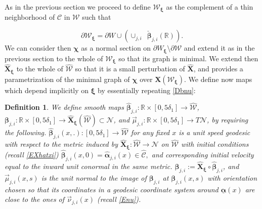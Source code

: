 \documentclass[12pt,namelimits,sumlimits]{amsart}
\newtheorem{definition}[theorem]{Definition}
\theoremstyle{remark}
\numberwithin{equation}{section}
\begin{document}
As in the previous section we proceed to
define ${{\mathcal{W}}}_{{\boldsymbol{\xi}}}$ as the complement of a thin neighborhood of ${{\mathcal{C}}}$ in ${{\mathcal{W}}}$
such that
\addtocounter{theorem}{1}
\begin{equation}
\label{EWxi}
\partial {{\mathcal{W}}}_{{\boldsymbol{\xi}}}=\partial W\cup
\left(\cup_{j,i} \,\,\,{\check{\boldsymbol{\beta}}}_{j,i}({\mathbb{R}})\right).
\end{equation}
We can consider then ${\boldsymbol{\chi}}$ as a normal section on $\partial W_{{\boldsymbol{\xi}}}\setminus\partial{{\mathcal{W}}}$
and extend it as in the previous section to the whole of ${{\mathcal{W}}}_{{\boldsymbol{\xi}}}$
so that its graph is minimal.
We extend then 
${\widehat{\boldsymbol{X}}}_{{\boldsymbol{\xi}}}$ to the whole of ${{\widehat{{\mathcal{W}}}}}$ so that it is a small perturbation of ${\widehat{\boldsymbol{X}}}$,
and provides a parametrization of the minimal graph of ${\boldsymbol{\chi}}$ over ${\boldsymbol{X}}({{\mathcal{W}}}_{{\boldsymbol{\xi}}})$.
We define now maps which depend implicitly on ${{\boldsymbol{\xi}}}$ by essentially repeating \ref{Dbnu}:

\addtocounter{equation}{1}
\begin{definition}
\label{Dbnuxi}
We define smooth maps
${\widehat{\boldsymbol{\beta}}}_{j,i}:{\mathbb{R}}\times[0,5\delta_1]\to{{\widehat{{\mathcal{W}}}}}$,
${\boldsymbol{\beta}}_{j,i}:{\mathbb{R}}\times[0,5\delta_1]\to{\widehat{\boldsymbol{X}}}_{{\boldsymbol{\xi}}}({{\widehat{{\mathcal{W}}}}})\subset{{\mathcal{N}}}$,
and
${\vec{\mu}}_{j,i}:{\mathbb{R}}\times[0,5\delta_1]\to T{{\mathcal{N}}}$,
by requiring the following.
${\widehat{\boldsymbol{\beta}}}_{j,i}(x,.):[0,5\delta_1]\to{{\widehat{{\mathcal{W}}}}}$ for any fixed $x$
is a unit speed geodesic with respect to the metric induced by ${\widehat{\boldsymbol{X}}}_{{\boldsymbol{\xi}}}:{{\widehat{{\mathcal{W}}}}}\to{{\mathcal{N}}}$ on ${{\widehat{{\mathcal{W}}}}}$
with initial conditions 
(recall \ref{EXhatxi})
$
{\widehat{\boldsymbol{\beta}}}_{j,i}(x,0)= {\widehat{\boldsymbol{\alpha}}}_{j,i}(x) \in {{\widehat{{\mathcal{C}}}}},
$
and corresponding initial velocity 
equal to the inward unit conormal in the same metric.
${\boldsymbol{\beta}}_{j,i}:={\widehat{\boldsymbol{X}}}_{{\boldsymbol{\xi}}}\circ{\widehat{\boldsymbol{\beta}}}_{j,i}$,
and 
${\vec{\mu}}_{j,i}(x,s)$ is the unit normal to the image of ${\boldsymbol{\beta}}_{j,i}$ at ${\boldsymbol{\beta}}_{j,i}(x,s)$
with orientation chosen so that its coordinates in a geodesic coordinate system around
${\underline{\boldsymbol{\alpha}}}(x)$ are close to the ones of ${\vec{\nu}}_{{j,i}}(x)$
(recall \ref{Enu}).
\end{definition}
\end{document}
